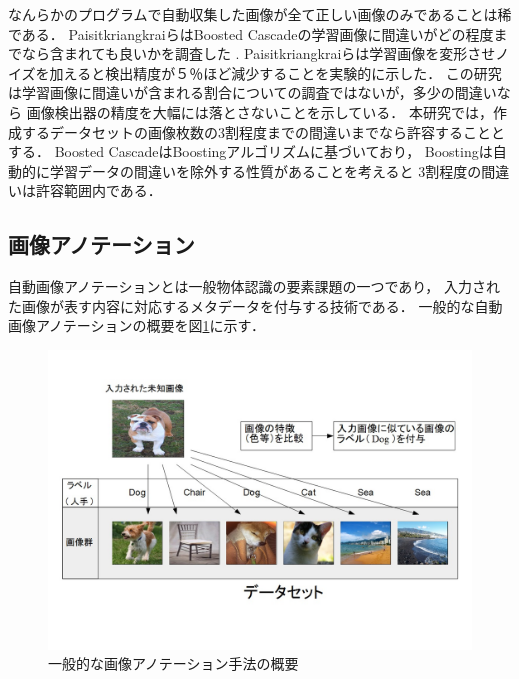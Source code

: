 \documentclass{deimj}
\begin{document}
なんらかのプログラムで自動収集した画像が全て正しい画像のみであることは稀である．
PaisitkriangkraiらはBoosted Cascadeの学習画像に間違いがどの程度までなら含まれても良いかを調査した
\cite{DBLP:journals/corr/abs-1009-5758}
.
Paisitkriangkraiらは学習画像を変形させノイズを加えると検出精度が５％ほど減少することを実験的に示した．
この研究は学習画像に間違いが含まれる割合についての調査ではないが，多少の間違いなら
画像検出器の精度を大幅には落とさないことを示している．
本研究では，作成するデータセットの画像枚数の3割程度までの間違いまでなら許容することとする．
Boosted CascadeはBoostingアルゴリズムに基づいており，
Boostingは自動的に学習データの間違いを除外する性質があることを考えると
3割程度の間違いは許容範囲内である．

\subsection{画像アノテーション}

自動画像アノテーションとは一般物体認識の要素課題の一つであり，
入力された画像が表す内容に対応するメタデータを付与する技術である．
一般的な自動画像アノテーションの概要を図\ref{fig:abst}に示す．

\begin{figure}[tb]
 \begin{center}
  \includegraphics[scale=0.28]{gaiyou.jpg}
 \end{center}
 \caption{一般的な画像アノテーション手法の概要}
 \label{fig:abst}
\end{figure}
\end{document}
